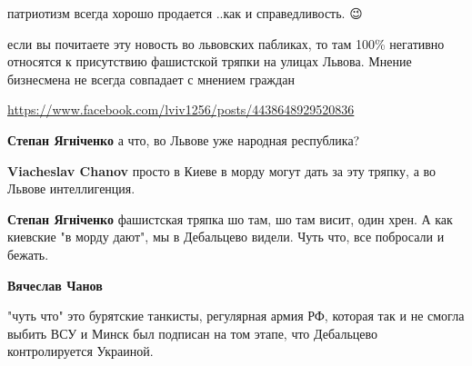 \begin{itemize}
патриотизм всегда хорошо продается ..как и справедливость. 😉

 

если вы почитаете эту новость во львовских пабликах, то там 100\% негативно
относятся к присутствию фашистской тряпки на улицах Львова. Мнение бизнесмена
не всегда совпадает с мнением граждан

\url{https://www.facebook.com/lviv1256/posts/4438648929520836}

\begin{itemize}
 
\textbf{Степан Ягніченко} а что, во Львове уже народная республика?

 
\textbf{Viacheslav Chanov} просто в Киеве в морду могут дать за эту тряпку, а во Львове интеллигенция.

 
\textbf{Степан Ягніченко} фашистская тряпка шо там, шо там висит, один хрен.
А как киевские "в морду дают", мы в Дебальцево видели. Чуть что, все побросали и бежать.

 
\textbf{Вячеслав Чанов} 

"чуть что" это бурятские танкисты, регулярная армия РФ, которая так и не смогла
выбить ВСУ и Минск был подписан на том этапе, что Дебальцево контролируется
Украиной.


\end{itemize}
\end{itemize}
